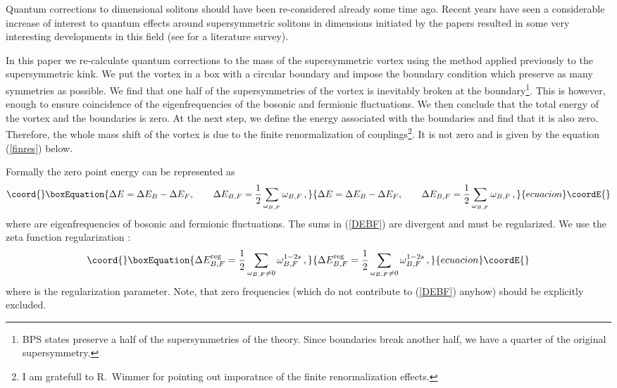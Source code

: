 \documentclass[a4paper,12pt]{article}
\begin{document}
Quantum corrections to \coordHE{} dimensional solitons
should have been re-considered already some time ago. Recent
years have seen a considerable increase of interest to quantum
effects around supersymmetric solitons in \coordHE{} dimensions
initiated by the papers \cite{skink} resulted in some very interesting
developments in this field (see \cite{Wimmer:2001yn} for a literature
survey). 

In this paper we re-calculate quantum corrections to the mass of the
supersymmetric vortex using the method \cite{Bordag:2002dg}
applied previously to the supersymmetric kink.
We put the vortex in a box with a circular boundary and impose the
boundary condition which preserve as many symmetries as possible.
We find that one half of the supersymmetries of the vortex is
inevitably broken at the boundary\footnote{BPS states preserve a
half of the supersymmetries of the theory. Since boundaries break
another half, we have a quarter of the original \coordHE{}
supersymmetry.}. This is however, enough to ensure coincidence of
the eigenfrequencies of the bosonic and fermionic fluctuations. We
then conclude that the total energy of the vortex and the
boundaries is zero. At the next step, we define the energy
associated with the boundaries and find that it is also zero.
Therefore, the whole mass shift of the vortex is due to the finite
renormalization of couplings\footnote{I am gratefull to R.~Wimmer
for pointing out imporatnce of the finite renormalization effects.}. 
It is not zero and is given by the equation
(\ref{finres}) below.

Formally the zero point energy can be represented as
\begin{equation}\coord{}\boxEquation{
\Delta E=\Delta E_B - \Delta E_F,\qquad \Delta E_{B,F} = \frac 12
\sum_{\omega_{B,F}} \omega_{B,F} \,,\label{DEBF}
}{
\Delta E=\Delta E_B - \Delta E_F,\qquad \Delta E_{B,F} = \frac 12
\sum_{\omega_{B,F}} \omega_{B,F} \,,}{ecuacion}\coordE{}\end{equation}
where \coordHE{} are eigenfrequencies of bosonic and fermionic
fluctuations. The sums in (\ref{DEBF}) are divergent and must be
regularized. We use the zeta function regularization \cite{zfun}:
\begin{equation}\coord{}\boxEquation{
\Delta E^{\rm reg}_{B,F}=\frac 12 \sum_{\omega_{B,F}\ne 0} \omega_{B,F}^{1-2s}
\,,
\label{DEreg}
}{
\Delta E^{\rm reg}_{B,F}=\frac 12 \sum_{\omega_{B,F}\ne 0} \omega_{B,F}^{1-2s}
\,,
}{ecuacion}\coordE{}\end{equation}
where \coordHE{} is the regularization parameter. Note, that zero frequencies
(which do not contribute to (\ref{DEBF}) anyhow) should be explicitly 
excluded.
\end{document}
